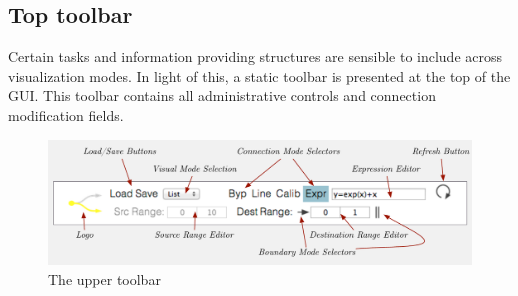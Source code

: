 	\subsection{Top toolbar} %
	\label{sec:top_toolbar}

Certain tasks and information providing structures are sensible to include across visualization modes. In light of this, a static toolbar is presented at the top of the GUI. This toolbar contains all administrative controls and connection modification fields. 

\begin{figure}[!h]
\centering
	\includegraphics[width=1\textwidth]{figures/top_toolbar}
\caption{The upper toolbar}
\label{fig:toolbar}
\end{figure}

